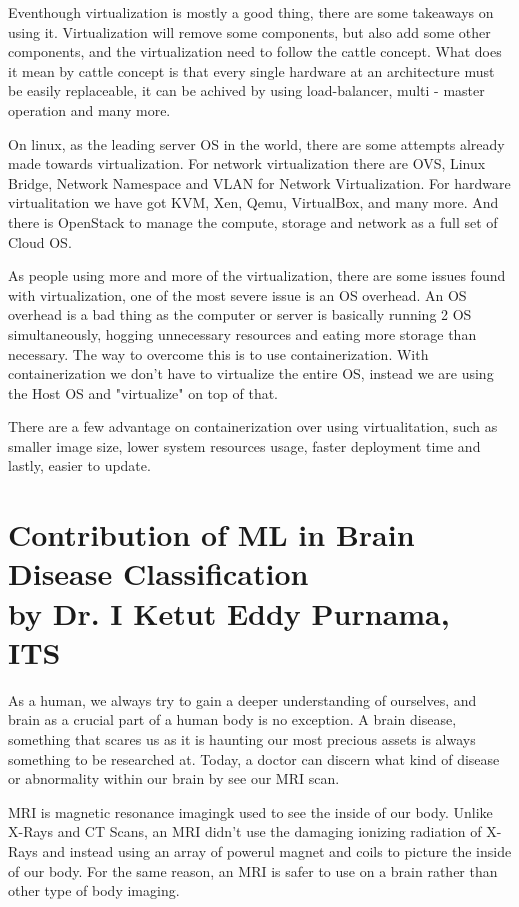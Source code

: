 \documentclass[12pt, a4paper]{article}
\begin{document}
Eventhough virtualization is mostly a good thing, there are some takeaways on using it. Virtualization will remove some components, but also add some other components, and the virtualization need to follow the cattle concept. What does it mean by cattle concept is that every single hardware at an architecture must be easily replaceable, it can be achived by using load-balancer, multi - master operation and many more.

On linux, as the leading server OS in the world, there are some attempts already made towards virtualization. For network virtualization there are OVS, Linux Bridge, Network Namespace and VLAN for Network Virtualization. For hardware virtualitation we have got KVM, Xen, Qemu, VirtualBox, and many more. And there is OpenStack to manage the compute, storage and network as a full set of Cloud OS.

As people using more and more of the virtualization, there are some issues found with virtualization, one of the most severe issue is an OS overhead. An OS overhead is a bad thing as the computer or server is basically running 2 OS simultaneously, hogging unnecessary resources and eating more storage than necessary. The way to overcome this is to use containerization. With containerization we don't have to virtualize the entire OS, instead we are using the Host OS and "virtualize" on top of that.

There are a few advantage on containerization over using virtualitation, such as smaller image size, lower system resources usage, faster deployment time and lastly, easier to update.

\section*{Contribution of ML in Brain Disease Classification \\ \footnotesize by Dr. I Ketut Eddy Purnama, ITS }

As a human, we always try to gain a deeper understanding of ourselves, and brain as a crucial part of a human body is no exception. A brain disease, something that scares us as it is haunting our most precious assets is always something to be researched at. Today, a doctor can discern what kind of disease or abnormality within our brain by see our MRI scan.

MRI is magnetic resonance imagingk used to see the inside of our body. Unlike X-Rays and CT Scans, an MRI didn't use the damaging ionizing radiation of X-Rays and instead using an array of powerul magnet and coils to picture the inside of our body. For the same reason, an MRI is safer to use on a brain rather than other type of body imaging.
\end{document}
